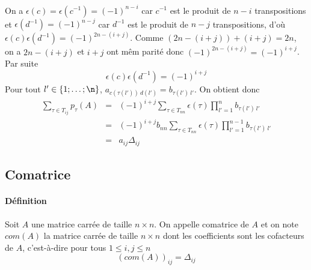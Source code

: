 On a $\epsilon(c) = \epsilon(c^{-1}) = (-1)^{n-i}$ car $c^{-1}$ est le produit de $n-i$ transpositions et $\epsilon(d^{-1}) = (-1)^{n-j}$ car $d^{-1}$ est le produit de $n-j$ transpositions, d'où $\epsilon(c) \epsilon(d^{-1}) = (-1)^{2n - (i+j)}$. Comme $(2n - (i+j)) + (i+j) = 2n$, on a $2n - (i+j)$ et $i+j$ ont mêm parité donc $(-1)^{2n - (i+j)} = (-1)^{i+j}$. Par suite
$$\epsilon(c) \epsilon(d^{-1}) = (-1)^{i+j}$$
Pour tout $l' \in \{1; \ldots; \n\}$, $a_{c(\tau(l')) ~ d(l')} = b_{\tau(l') ~ l'}$. On obtient donc
\begin{eqnarray*}
  \sum_{\tau \in T_{ij}} p_{\tau}(A) &=& (-1)^{i+j} \sum_{\tau \in T_{nn}} \epsilon(\tau) \prod_{l'=1}^{n} b_{\tau(l') ~ l'} \\
    &=& (-1)^{i+j} b_{nn} \sum_{\tau \in T_{nn}} \epsilon(\tau) \prod_{l' = 1}^{n-1} b_{\tau(l') ~ l'} \\
    &=& a_{ij} \Delta_{ij}
\end{eqnarray*}

%
\subsection{Comatrice}
%
\paragraph{Définition} Soit $A$ une matrice carrée de taille $n \times n$. On appelle comatrice de $A$ et on note $com(A)$ la matrice carrée de taille $n \times n$ dont les coefficients sont les cofacteurs de $A$, c'est-à-dire pour tous $1 \leq i, j \leq n$
$$(com(A))_{ij} = \Delta_{ij}$$

